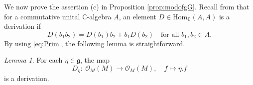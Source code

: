 \documentclass[12pt, a4paper]{amsart}
\newcommand{\BC}{{\mathbb {C}}}
\newcommand{\CG}{{\mathcal {G}}}
\newcommand{\CO}{{\mathcal {O}}}
\newcommand{\Hom}{{\mathrm{Hom}}}
\newcommand{\Ev}{\operatorname{Ev}}
\newcommand{\g}{\mathfrak g}
\newcommand{\la}{\langle}
\newcommand{\ra}{\rangle}
\theoremstyle{Theorem}
\theoremstyle{Theorem}
\theoremstyle{Theorem}
\theoremstyle{Theorem}
\theoremstyle{Plain}
\theoremstyle{remark}
\theoremstyle{remark}
\theoremstyle{Definition}
\newtheorem{lemd}[dfn]{Lemma}
\numberwithin{equation}{section}
\begin{document}
We now prove the assertion (c) in Proposition \ref{prop:modofgG}.
 Recall from \cite[Definition 3.2]{CSW1} that for a commutative unital $\BC$-algebra $A$, an element $D\in \Hom_{\BC} (A,A)$ is a derivation if
\[D(b_1b_2)=D(b_1)b_2+b_1D(b_2)\quad \text{for all $b_1,b_2\in A$.}\]  By using \eqref{eq:Prim}, the following lemma is straightforward.
\begin{lemd}\label{lem:etader}
	  For each $\eta\in \g$, the map
	  \[D_{\eta}:\ \CO_M(M)\rightarrow \CO_M(M), \quad  f\mapsto\eta.f\]
	 is a derivation. 
\end{lemd} %

\end{document}

